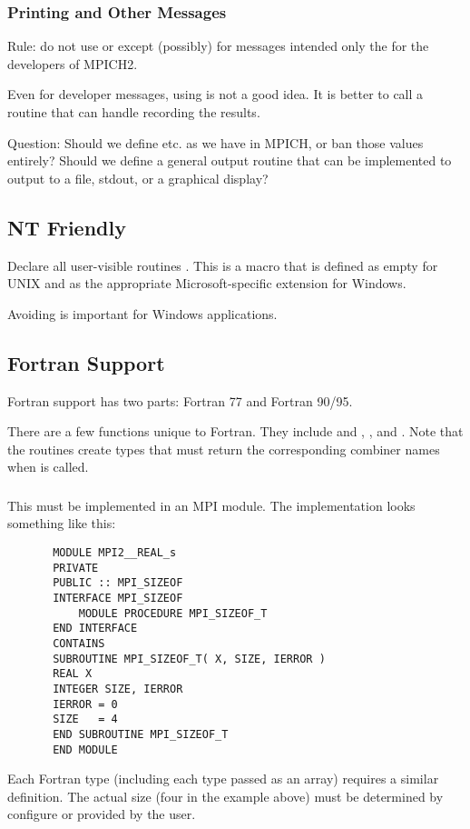 \documentclass{article}
\begin{document}
\subsubsection{Printing and Other Messages}
Rule: do not use  or  except (possibly) for
messages intended only the for the developers of MPICH2.

Even for developer messages, using  is not a good idea.
It is better to call a routine that can handle recording the results.


Question: Should we define  etc. as we have in MPICH, or
ban those values entirely?  Should we define a general output routine
that can be implemented to output to a file, stdout, or a graphical display?

\subsection{NT Friendly}

Declare all user-visible routines .
This is a 
macro that is defined as empty for UNIX and as the appropriate
Microsoft-specific extension for Windows.

Avoiding  is important for Windows applications.

\subsection{Fortran Support}
Fortran support has two parts: Fortran 77 and Fortran 90/95.  

There are a few functions unique to Fortran.  They include
 and , 
, and 
.  Note that the 
routines create types that must return the corresponding combiner names when
 is called.

\subsubsection{}
This must be implemented in an MPI module.  The implementation looks something
like this:
\begin{verbatim}
       MODULE MPI2__REAL_s
       PRIVATE
       PUBLIC :: MPI_SIZEOF
       INTERFACE MPI_SIZEOF
           MODULE PROCEDURE MPI_SIZEOF_T
       END INTERFACE
       CONTAINS
       SUBROUTINE MPI_SIZEOF_T( X, SIZE, IERROR )
       REAL X
       INTEGER SIZE, IERROR
       IERROR = 0
       SIZE   = 4
       END SUBROUTINE MPI_SIZEOF_T       
       END MODULE
\end{verbatim}
Each Fortran type (including each type passed as an array) requires a similar
definition.  The actual size (four in the example above) must be determined by
configure or provided by the user.
\end{document}
